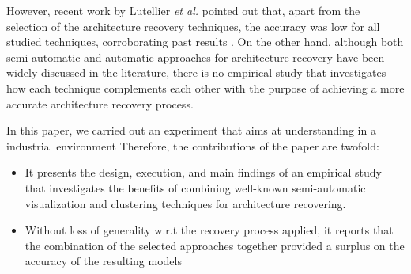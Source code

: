 However, recent work by Lutellier \textit{et al.} \cite{Lutellier_2015} pointed out that, apart from the selection of the architecture recovery techniques, the accuracy was low for all studied techniques, corroborating past results \cite{Garcia:ASE2013}. On the other hand, although both semi-automatic and automatic approaches for architecture recovery have been widely discussed in the literature, there is no empirical study that investigates how each technique complements each other with the purpose of achieving a more accurate architecture recovery process. 

In this paper, we carried out an experiment that aims at understanding in a industrial environment  Therefore, the contributions of the paper are twofold:
\begin{itemize}
\item It presents the design, execution, and main findings of an empirical study that 
investigates the benefits of combining well-known semi-automatic visualization and clustering techniques for architecture recovering. 
\item Without loss of generality w.r.t the recovery process applied, it reports that the combination of the selected approaches together provided a surplus on the accuracy of the resulting models    
\end{itemize}


